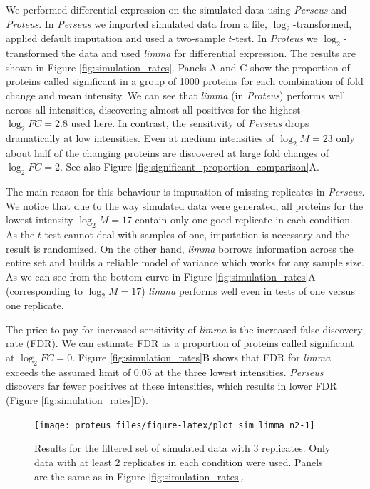\documentclass[]{article}
\begin{document}
We performed differential expression on the simulated data using
\emph{Perseus} and \emph{Proteus}. In \emph{Perseus} we imported
simulated data from a file, \(\log_2\)-transformed, applied default
imputation and used a two-sample \(t\)-test. In \emph{Proteus} we
\(\log_2\)-transformed the data and used \emph{limma} for differential
expression. The results are shown in Figure \ref{fig:simulation_rates}.
Panels A and C show the proportion of proteins called significant in a
group of 1000 proteins for each combination of fold change and mean
intensity. We can see that \emph{limma} (in \emph{Proteus}) performs
well across all intensities, discovering almost all positives for the
highest \(\log_2 FC = 2.8\) used here. In contrast, the sensitivity of
\emph{Perseus} drops dramatically at low intensities. Even at medium
intensities of \(\log_2 M = 23\) only about half of the changing
proteins are discovered at large fold changes of \(\log_2 FC = 2\). See
also Figure \ref{fig:significant_proportion_comparison}A.

The main reason for this behaviour is imputation of missing replicates
in \emph{Perseus}. We notice that due to the way simulated data were
generated, all proteins for the lowest intensity \(\log_2 M = 17\)
contain only one good replicate in each condition. As the \(t\)-test
cannot deal with samples of one, imputation is necessary and the result
is randomized. On the other hand, \emph{limma} borrows information
across the entire set and builds a reliable model of variance which
works for any sample size. As we can see from the bottom curve in Figure
\ref{fig:simulation_rates}A (corresponding to \(\log_2 M = 17\))
\emph{limma} performs well even in tests of one versus one replicate.

The price to pay for increased sensitivity of \emph{limma} is the
increased false discovery rate (FDR). We can estimate FDR as a
proportion of proteins called significant at \(\log_2 FC = 0\). Figure
\ref{fig:simulation_rates}B shows that FDR for \emph{limma} exceeds the
assumed limit of 0.05 at the three lowest intensities. \emph{Perseus}
discovers far fewer positives at these intensities, which results in
lower FDR (Figure \ref{fig:simulation_rates}D).

\begin{figure}[H]

{\centering \texttt{[image: proteus\_files/figure-latex/plot\_sim\_limma\_n2-1]} 

}

\caption{\label{fig:simulation_filt_rates}Results for the filtered set of simulated data with 3 replicates. Only data with at least 2 replicates in each condition were used. Panels are the same as in Figure \ref{fig:simulation_rates}.}\label{fig:plot_sim_limma_n2}
\end{figure}
\end{document}
